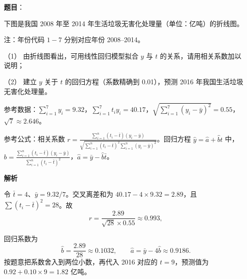 \begin{answer}

\textbf{题目}：

下图是我国 2008 年至 2014 年生活垃圾无害化处理量（单位：亿吨）的折线图。
\nopagebreak[4]
\begin{center}\end{center}
\nopagebreak[4]
注：年份代码 \(1-7\) 分别对应年份 2008–2014。

（1） 由折线图看出，可用线性回归模型拟合 \(y\) 与 \(t\) 的关系，请用相关系数加以说明；

（2） 建立 \(y\) 关于 \(t\) 的回归方程（系数精确到 0.01），预测 2016 年我国生活垃圾无害化处理量。

参考数据：\(\displaystyle\sum_{i=1}^7 y_i=9.32\)，\(\displaystyle\sum_{i=1}^7t_i y_i=40.17\)，\(\displaystyle\sqrt{\sum_{i=1}^7(y_i-\bar y)^2}=0.55\)，\(\sqrt7\approx2.646\)。

参考公式：相关系数 \(\displaystyle r=\frac{\sum_{i=1}^n(t_i-\bar t)(y_i-\bar y)}{\sqrt{\sum_{i=1}^n(t_i-\bar t)^2\sum_{i=1}^n(y_i-\bar y)^2}}\)。回归方程 \(\hat y=\hat a+\hat bt\) 中，\(\displaystyle\hat b=\frac{\sum_{i=1}^n(t_i-\bar t)(y_i-\bar y)}{\sum_{i=1}^n(t_i-\bar t)^2}\)，\(\hat a=\bar y-\hat b\bar t\)。

\textbf{解析}


令 \(\bar t=4\)、\(\bar y=9.32/7\)。交叉离差和为 \(40.17-4\times9.32=2.89\)，且 \(\sum(t_i-\bar t)^2=28\)。故
\nopagebreak[4]
\[
r=\frac{2.89}{\sqrt{28}\times0.55}\approx0.993,
\]


回归系数为
\nopagebreak[4]
\[
\hat b=\frac{2.89}{28}\approx0.1032,\qquad
\hat a=\bar y-4\hat b\approx0.9186.
\]
按题意把系数舍入到两位小数，再代入 2016 对应的 \(t=9\)，预测值为 \(0.92+0.10\times9=1.82\) 亿吨。



\end{answer}
